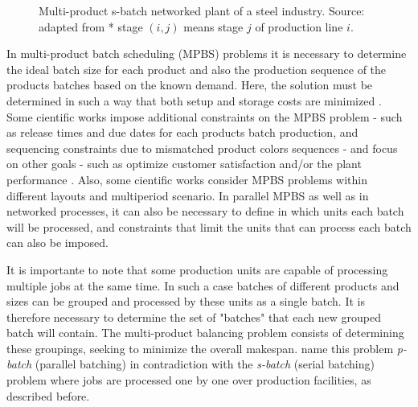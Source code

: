 \documentclass[authoryear,manuscript,12pt]{elsarticle}
\begin{document}
\begin{figure}[h]
\begin{center}
\end{center}
\caption{Multi-product s-batch networked plant of a steel industry. Source: adapted from \cite{LiuEtAl2020} * stage $(i, j)$ means stage $j$ of production line $i$.}
\end{figure}

In multi-product batch scheduling (MPBS) problems it is necessary to determine the ideal batch size for each product and also the production sequence of the products batches based on the known demand. Here, the solution must be determined in such a way that both setup and storage costs are minimized \citep{Eilon1985, Omega1993, LiuEtAl2020}. Some cientific works impose additional constraints on the MPBS problem - such as release times and due dates for each products batch production, and sequencing constraints due to mismatched product colors sequences - and focus on other goals - such as optimize customer satisfaction and/or the plant performance \citep{MendezEtAll2000, ShiEtAll2017}. Also, some cientific works consider MPBS problems within different layouts and multiperiod scenario. In parallel MPBS as well as in networked processes, it can also be necessary to define in which units each batch will be processed, and constraints that limit the units that can process each batch can also be imposed.

It is importante to note that some production units are capable of processing multiple jobs at the same time. In such a case batches of different products and sizes can be grouped and processed by these units as a single batch. It is therefore necessary to determine the set of "batches" that each new grouped batch will contain. The multi-product balancing problem consists of determining these groupings, seeking to minimize the overall makespan. \cite{KashanOzturk2022} name this problem \emph{p-batch} (parallel batching) in contradiction with the \emph{s-batch} (serial batching) problem where jobs are processed one by one over production facilities, as described before.
\end{document}

